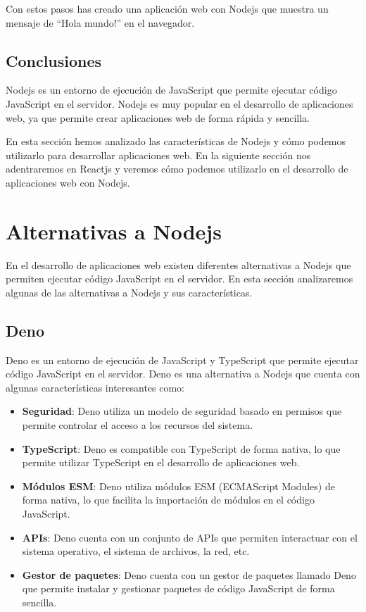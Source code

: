 \documentclass[
  a4paper,
  DIV=11,
  numbers=noendperiod,
  onepage,
  openany]{scrreprt}
\begin{document}
Con estos pasos has creado una aplicación web con Nodejs que muestra un
mensaje de ``Hola mundo!'' en el navegador.

\section{Conclusiones}\label{conclusiones-2}

Nodejs es un entorno de ejecución de JavaScript que permite ejecutar
código JavaScript en el servidor. Nodejs es muy popular en el desarrollo
de aplicaciones web, ya que permite crear aplicaciones web de forma
rápida y sencilla.

En esta sección hemos analizado las características de Nodejs y cómo
podemos utilizarlo para desarrollar aplicaciones web. En la siguiente
sección nos adentraremos en Reactjs y veremos cómo podemos utilizarlo en
el desarrollo de aplicaciones web con Nodejs.

\chapter{Alternativas a Nodejs}\label{alternativas-a-nodejs}

En el desarrollo de aplicaciones web existen diferentes alternativas a
Nodejs que permiten ejecutar código JavaScript en el servidor. En esta
sección analizaremos algunas de las alternativas a Nodejs y sus
características.

\section{Deno}\label{deno}

Deno es un entorno de ejecución de JavaScript y TypeScript que permite
ejecutar código JavaScript en el servidor. Deno es una alternativa a
Nodejs que cuenta con algunas características interesantes como:

\begin{itemize}
\item
  \textbf{Seguridad}: Deno utiliza un modelo de seguridad basado en
  permisos que permite controlar el acceso a los recursos del sistema.
\item
  \textbf{TypeScript}: Deno es compatible con TypeScript de forma
  nativa, lo que permite utilizar TypeScript en el desarrollo de
  aplicaciones web.
\item
  \textbf{Módulos ESM}: Deno utiliza módulos ESM (ECMAScript Modules) de
  forma nativa, lo que facilita la importación de módulos en el código
  JavaScript.
\item
  \textbf{APIs}: Deno cuenta con un conjunto de APIs que permiten
  interactuar con el sistema operativo, el sistema de archivos, la red,
  etc.
\item
  \textbf{Gestor de paquetes}: Deno cuenta con un gestor de paquetes
  llamado Deno que permite instalar y gestionar paquetes de código
  JavaScript de forma sencilla.
\end{itemize}
\end{document}
